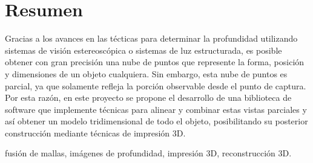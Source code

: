 \chapter{Resumen}
Gracias a los avances en las técticas para determinar la profundidad
utilizando sistemas de visión estereoscópica o sistemas de luz estructurada,
es posible obtener con gran precisión una nube de puntos que represente
la forma, posición y dimensiones de un objeto cualquiera.
Sin embargo, esta nube de puntos es parcial, ya que solamente refleja
la porción observable desde el punto de captura.
Por esta razón, en este proyecto se propone el desarrollo de una biblioteca de software
que implemente técnicas para alinear y combinar estas vistas parciales
y así obtener un modelo tridimensional de todo el objeto,
posibilitando su posterior construcción mediante técnicas de impresión 3D.

 fusión de mallas, imágenes de profundidad, impresión 3D, reconstrucción 3D.
